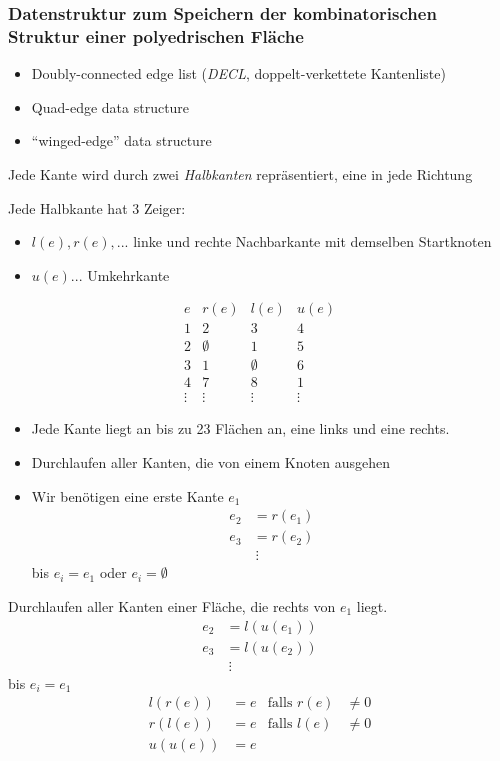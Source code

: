 \subsubsection{Datenstruktur zum Speichern der kombinatorischen Struktur einer polyedrischen Fläche}
\begin{itemize}
 \item Doubly-connected edge list (\emph{DECL}, doppelt-verkettete Kantenliste)
 \item Quad-edge data structure
 \item "`winged-edge"' data structure
\end{itemize}
Jede Kante wird durch zwei \emph{Halbkanten} repräsentiert, eine in jede Richtung
\begin{center}
\end{center}
Jede Halbkante hat 3 Zeiger:
\begin{itemize}
 \item $l(e), r(e),...$ linke und rechte Nachbarkante mit demselben Startknoten
 \item $u(e)...$ Umkehrkante
\end{itemize}
\begin{center}
\end{center}
\[
 \begin{array}{c||c|c|c}
  e & r(e) & l(e) & u(e)\\
  \hline\hline
  1 & 2 & 3 & 4\\
  2 &\emptyset & 1 & 5\\
  3 & 1 & \emptyset & 6\\
  4 & 7 & 8 & 1\\
  \vdots & \vdots & \vdots & \vdots
 \end{array}
\]
\begin{itemize}
\item Jede Kante liegt an bis zu 23 Flächen an, eine links und eine rechts.
\item Durchlaufen aller Kanten, die von einem Knoten ausgehen
\item Wir benötigen eine erste Kante $e_1$
	\begin{align*}
	 e_2 &= r(e_1)\\
	 e_3 &= r(e_2)\\
	&\ \vdots
	\end{align*}
	bis $e_i = e_1$ oder $e_i = \emptyset$
\end{itemize}
Durchlaufen aller Kanten einer Fläche, die rechts von $e_1$ liegt.
\begin{align*}
 e_2 &= l(u(e_1)) \\
 e_3 &= l(u(e_2)) \\
     &\ \vdots
\end{align*}
bis $e_i = e_1$
\begin{align*}
 l(r(e)) &= e & \text{falls } r(e) &\neq 0\\
 r(l(e)) &= e & \text{falls } l(e) &\neq 0\\
 u(u(e)) &= e
\end{align*}
\begin{center}
\end{center}

